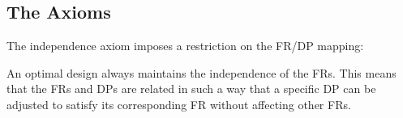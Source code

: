 \subsection{The Axioms}

The independence axiom imposes a restriction on the FR/DP mapping:

\begin{axiom}[Independence]
  \label{axm:independ}
  An optimal design always maintains the independence of the FRs.  This means that the FRs and DPs are related in
  such a way that a specific DP can be adjusted to satisfy its corresponding FR without affecting other FRs.
\end{axiom}

\begin{figure}[h]
  \label{fig:coupling}
\end{figure}
